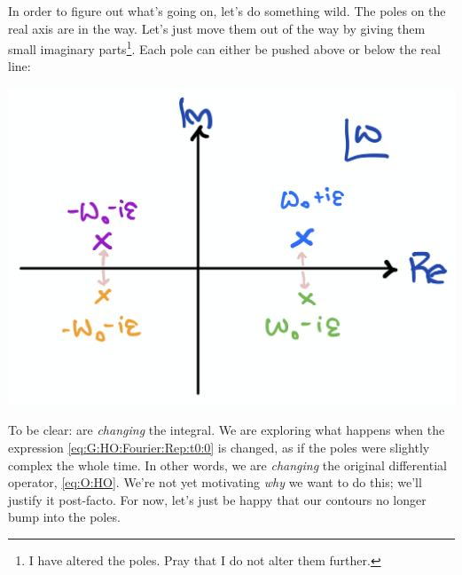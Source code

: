 In order to figure out what's going on, let's do something wild. The poles on the real axis are in the way. Let's just move them out of the way by giving them small imaginary parts\footnote{I have altered the poles. Pray that I do not alter them further.}. Each pole can either be pushed above or below the real line:
\begin{center}
\includegraphics[width=.4\textwidth]{figures/Lec_2017_16_HO_PoleShift.png}
\end{center}
To be clear: are \emph{changing} the integral. We are exploring what happens when the expression \eqref{eq:G:HO:Fourier:Rep:t0:0} is changed, as if the poles were slightly complex the whole time. In other words, we are \emph{changing} the original differential operator, \eqref{eq:O:HO}. We're not yet motivating \emph{why} we want to do this; we'll justify it post-facto. For now, let's just be happy that our contours no longer bump into the poles. 

